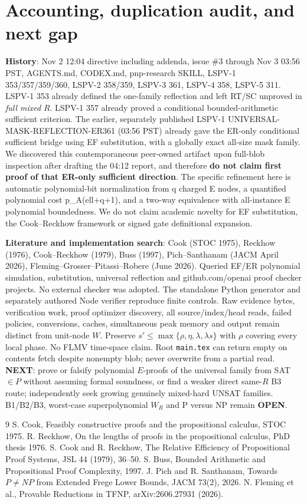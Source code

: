 \documentclass[11pt]{article}
\begin{document}
\section*{Accounting, duplication audit, and next gap}
\noindent\textbf{History}: Nov 2 12:04 directive including addenda, issue \#3 through Nov 3 03:56 PST, AGENTS.md, CODEX.md, pnp-research SKILL, LSPV-1 353/357/359/360, LSPV-2 358/359, LSPV-3 361, LSPV-4 358, LSPV-5 311. LSPV-1 353 already defined the one-family reflection and left RT/SC unproved in \emph{full mixed} $R$. LSPV-1 357 already proved a conditional bounded-arithmetic sufficient criterion. The earlier, separately published LSPV-1 UNIVERSAL-MASK-REFLECTION-ER361 (03:56 PST) already gave the ER-only conditional sufficient bridge using EF substitution, with a globally exact all-size mask family. We discovered this contemporaneous peer-owned artifact upon full-blob inspection after drafting the 04:12 report, and therefore \textbf{do not claim first proof of that ER-only sufficient direction}. The specific refinement here is automatic polynomial-bit normalization from q charged E nodes, a quantified polynomial cost p_A(ell+q+1), and a two-way equivalence with all-instance E polynomial boundedness. We do not claim academic novelty for EF substitution, the Cook--Reckhow framework or signed gate definitional expansion.

\noindent\textbf{Literature and implementation search}: Cook (STOC 1975), Reckhow (1976), Cook--Reckhow (1979), Buss (1997), Pich--Santhanam (JACM April 2026), Fleming--Grosser--Pitassi--Robere (June 2026). Queried EF/ER polynomial simulation, substitution, universal reflection and github.com/openai proof checker projects. No external checker was adopted. The standalone Python generator and separately authored Node verifier reproduce finite controls. Raw evidence bytes, verification work, proof optimizer discovery, all source/index/head reads, failed policies, conversions, caches, simultaneous peak memory and output remain distinct from unit-node $W$. Preserve $s'\le\max\{\rho,\eta,\lambda,\lambda s\}$ with $\rho$ covering every local phase. No FLMV time-space claim. Root \texttt{main.tex} can return empty on contents fetch despite nonempty blob; never overwrite from a partial read. \textbf{NEXT}: prove or falsify polynomial $E$-proofs of the universal family from SAT$\in P$ without assuming formal soundness, or find a weaker direct same-$R$ B3 route; independently seek growing genuinely mixed-hard UNSAT families. B1/B2/B3, worst-case superpolynomial $W_R$ and P versus NP remain \textbf{OPEN}.
\begin{thebibliography}{9}
 S. Cook, Feasibly constructive proofs and the propositional calculus, STOC 1975.
 R. Reckhow, On the lengths of proofs in the propositional calculus, PhD thesis 1976.
 S. Cook and R. Reckhow, The Relative Efficiency of Propositional Proof Systems, JSL 44 (1979), 36--50.
 S. Buss, Bounded Arithmetic and Propositional Proof Complexity, 1997.
 J. Pich and R. Santhanam, Towards $P\ne NP$ from Extended Frege Lower Bounds, JACM 73(2), 2026.
 N. Fleming et al., Provable Reductions in TFNP, arXiv:2606.27931 (2026).
\end{thebibliography}
\end{document}

